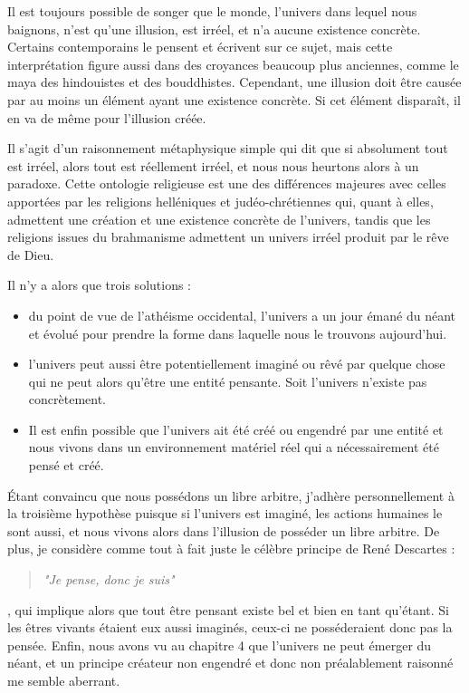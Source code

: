 Il est toujours possible de songer que le monde, l’univers dans lequel nous baignons, n’est qu’une illusion, est irréel, et n’a aucune existence concrète. Certains contemporains le pensent et écrivent sur ce sujet, mais cette interprétation figure aussi dans des croyances beaucoup plus anciennes, comme le maya des hindouistes et des bouddhistes. Cependant, une illusion doit être causée par au moins un élément ayant une existence concrète. Si cet élément disparaît, il en va de même pour l’illusion créée.

Il s’agit d’un raisonnement métaphysique simple qui dit que si absolument tout est irréel, alors tout est réellement irréel, et nous nous heurtons alors à un paradoxe. Cette ontologie religieuse est une des différences majeures avec celles apportées par les religions helléniques et judéo-chrétiennes qui, quant à elles, admettent une création et une existence concrète de l’univers, tandis que les religions issues du brahmanisme admettent un univers irréel produit par le rêve de Dieu.

Il n’y a alors que trois solutions :

\begin{itemize}
\item du point de vue de l'athéisme occidental, l’univers a un jour émané du néant et évolué pour prendre la forme dans laquelle nous le trouvons aujourd’hui.
\item l’univers peut aussi être potentiellement imaginé ou rêvé par quelque chose qui ne peut alors qu’être une entité pensante. Soit l’univers n’existe pas concrètement.
\item Il est enfin possible que l’univers ait été créé ou engendré par une entité et nous vivons dans un environnement matériel réel qui a nécessairement été pensé et créé.
\end{itemize}

Étant convaincu que nous possédons un libre arbitre, j’adhère personnellement à la troisième hypothèse puisque si l’univers est imaginé, les actions humaines le sont aussi, et nous vivons alors dans l’illusion de posséder un libre arbitre. De plus, je considère comme tout à fait juste le célèbre principe de René Descartes : \begin{quote}\textit{"Je pense, donc je suis"}\end{quote}, qui implique alors que tout être pensant existe bel et bien en tant qu’étant. Si les êtres vivants étaient eux aussi imaginés, ceux-ci ne posséderaient donc pas la pensée. Enfin, nous avons vu au chapitre 4 que l'univers ne peut émerger du néant, et un principe créateur non engendré et donc non préalablement raisonné me semble aberrant.

